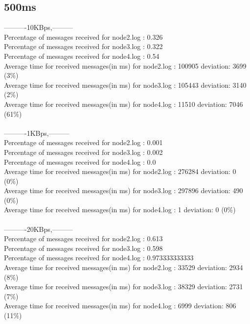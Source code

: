     \subsection{500ms}\label{RawResults:500ms}
        ----------10KBps,---------\\
        Percentage of messages received for node2.log : 0.326\\
        Percentage of messages received for node3.log : 0.322\\
        Percentage of messages received for node4.log : 0.54\\
        Average time for received messages(in ms) for  node2.log : 100905 	deviation: 3699 (3\%)\\
        Average time for received messages(in ms) for  node3.log : 105443 	deviation: 3140 (2\%)\\
        Average time for received messages(in ms) for  node4.log : 11510 	deviation: 7046 (61\%)\\\\
        ----------1KBps,---------\\
        Percentage of messages received for node2.log : 0.001\\
        Percentage of messages received for node3.log : 0.002\\
        Percentage of messages received for node4.log : 0.0\\
        Average time for received messages(in ms) for  node2.log : 276284 	deviation: 0 (0\%)\\
        Average time for received messages(in ms) for  node3.log : 297896 	deviation: 490 (0\%)\\
        Average time for received messages(in ms) for  node4.log : 1 	deviation: 0 (0\%)\\\\
        ----------20KBps,---------\\
        Percentage of messages received for node2.log : 0.613\\
        Percentage of messages received for node3.log : 0.598\\
        Percentage of messages received for node4.log : 0.973333333333\\
        Average time for received messages(in ms) for  node2.log : 33529 	deviation: 2934 (8\%)\\
        Average time for received messages(in ms) for  node3.log : 38329 	deviation: 2731 (7\%)\\
        Average time for received messages(in ms) for  node4.log : 6999 	deviation: 806 (11\%)\\\\
